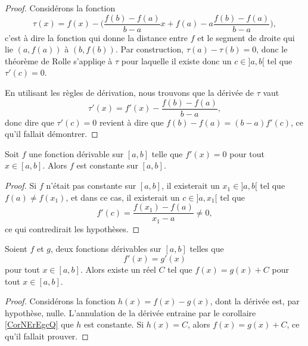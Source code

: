 \begin{proof}
    Considérons la fonction
    \begin{equation}
        \tau(x)=f(x)-\big( \frac{ f(b)-f(a) }{ b-a }x + f(a) - a\frac{ f(b)-f(a) }{ b-a } \big),
    \end{equation}
    c'est à dire la fonction qui donne la distance entre $f$ et le segment de droite qui lie $(a,f(a))$ à $(b,f(b))$. Par construction, $\tau(a)-\tau(b)=0$, donc le théorème de Rolle s'appliqe à $\tau$ pour laquelle il existe donc un $c\in]a,b[$ tel que $\tau'(c)=0$.

    En utilisant les règles de dérivation, nous trouvons que la dérivée de $\tau$ vaut
    \begin{equation}
        \tau'(x)= f'(x)-\frac{ f(b)-f(a) }{ b-a },
    \end{equation}
    donc dire que $\tau'(c)=0$ revient à dire que $f(b)-f(a)=(b-a)f'(c)$, ce qu'il fallait démontrer.
\end{proof}

\begin{corollary}
Soit $f$ une fonction dérivable sur $[a,b]$ telle que $f'(x) = 0$ pour tout $x \in [a,b]$. Alors $f$ est constante sur $[a,b]$.
\end{corollary}

\begin{proof}
    Si $f$ n'était pas constante sur $[a,b]$, il existerait un $x_1\in ]a,b[$ tel que $f(a)\neq f(x_1)$, et dans ce cas, il existerait un $c\in]a,x_1[$ tel que 
    \begin{equation}
        f'(c)=\frac{ f(x_1)-f(a) }{ x_1-a }\neq 0,
    \end{equation}
    ce qui contredirait les hypothèses.
\end{proof}

\begin{corollary}   \label{CorNErEgcQ}
    Soient $f$ et $g$, deux fonctions dérivables sur $[a,b]$ telles que
    \begin{equation}
        f'(x) = g'(x)
    \end{equation}
    pour tout $x \in [a,b]$. Alors existe un réel $C$ tel que $f (x) = g (x) + C$ pour tout $x\in [a,b]$.
\end{corollary}

\begin{proof}
    Considérons la fonction $h(x)=f(x)-g(x)$, dont la dérivée est, par hypothèse, nulle. L'annulation de la dérivée entraine par le corollaire \ref{CorNErEgcQ} que $h$ est  constante. Si $h(x)=C$, alors $f(x)=g(x)+C$, ce qu'il fallait prouver.
\end{proof}

